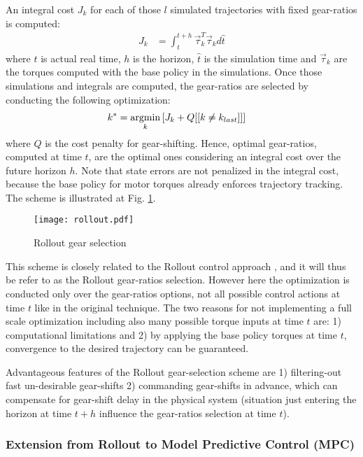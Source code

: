An integral cost $J_k$ for each of those $l$ simulated trajectories with fixed gear-ratios is computed:
%
\begin{align}
J_k &= \int_t^{t+h} \vec{\tau}_k^T \vec{\tau}_k d\hat{t}
\end{align}
%
where $t$ is actual real time, $h$ is the horizon, $\hat{t}$ is the simulation time and $\vec{\tau}_k$ are the torques computed with the base policy in the simulations. Once those simulations and integrals are computed, the gear-ratios are selected by conducting the following optimization:
%
\begin{align}
k^{*}      &= \operatornamewithlimits{argmin}\limits_{k} \left[ J_k + Q [[ k \neq k_{last}]] \right] %
\end{align}
%
where $Q$ is the cost penalty for gear-shifting. Hence, optimal gear-ratios, computed at time $t$, are the optimal ones considering an integral cost over the future horizon $h$. Note that state errors are not penalized in the integral cost, because the base policy for motor torques already enforces trajectory tracking. The scheme is illustrated at Fig. \ref{fig:rollout}.
%
\begin{figure}[htp]
	\centering
		\texttt{[image: rollout.pdf]}
	\caption[Rollout gear selection]{Rollout gear selection}
	\label{fig:rollout}
\end{figure}


This scheme is closely related to the Rollout control approach \cite{bertsekas_dynamic_2000}, and it will thus be refer to as the Rollout gear-ratios selection.  However here the optimization is conducted only over the gear-ratios options, not all possible control actions at time $t$ like in the original technique. The two reasons for not implementing a full scale optimization including also many possible torque inputs at time $t$ are: 1) computational limitations and 2) by applying the base policy torques at time $t$, convergence to the desired trajectory can be guaranteed. 

Advantageous features of the Rollout gear-selection scheme are 1) filtering-out fast un-desirable gear-shifts 2) commanding gear-shifts in advance, which can compensate for gear-shift delay in the physical system (situation just entering the horizon at time $t+h$ influence the gear-ratios selection at time $t$).

\subsubsection{Extension from Rollout to Model Predictive Control (MPC)}

